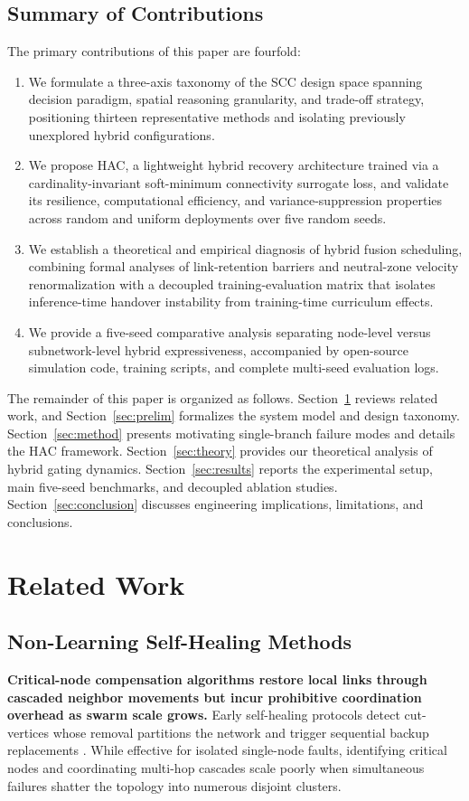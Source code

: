 \documentclass[11pt]{article}
\theoremstyle{plain}
\theoremstyle{definition}
\theoremstyle{remark}
\begin{document}
\subsection{Summary of Contributions}
The primary contributions of this paper are fourfold:
\begin{enumerate}[nosep]
  \item We formulate a three-axis taxonomy of the SCC design space spanning decision paradigm, spatial reasoning granularity, and trade-off strategy, positioning thirteen representative methods and isolating previously unexplored hybrid configurations.
  \item We propose HAC, a lightweight hybrid recovery architecture trained via a cardinality-invariant soft-minimum connectivity surrogate loss, and validate its resilience, computational efficiency, and variance-suppression properties across random and uniform deployments over five random seeds.
  \item We establish a theoretical and empirical diagnosis of hybrid fusion scheduling, combining formal analyses of link-retention barriers and neutral-zone velocity renormalization with a decoupled training-evaluation matrix that isolates inference-time handover instability from training-time curriculum effects.
  \item We provide a five-seed comparative analysis separating node-level versus subnetwork-level hybrid expressiveness, accompanied by open-source simulation code, training scripts, and complete multi-seed evaluation logs.
\end{enumerate}

The remainder of this paper is organized as follows. Section~\ref{sec:related-work} reviews related work, and Section~\ref{sec:prelim} formalizes the system model and design taxonomy. Section~\ref{sec:method} presents motivating single-branch failure modes and details the HAC framework. Section~\ref{sec:theory} provides our theoretical analysis of hybrid gating dynamics. Section~\ref{sec:results} reports the experimental setup, main five-seed benchmarks, and decoupled ablation studies. Section~\ref{sec:conclusion} discusses engineering implications, limitations, and conclusions.

\section{Related Work}
\label{sec:related-work}

\subsection{Non-Learning Self-Healing Methods}
\textbf{Critical-node compensation algorithms restore local links through cascaded neighbor movements but incur prohibitive coordination overhead as swarm scale grows.} Early self-healing protocols detect cut-vertices whose removal partitions the network and trigger sequential backup replacements \citep{abbasi2008movement,akkaya2009distributed,mi2015obstacle,zhang2024uavenabled}. While effective for isolated single-node faults, identifying critical nodes and coordinating multi-hop cascades scale poorly when simultaneous failures shatter the topology into numerous disjoint clusters.
\end{document}
